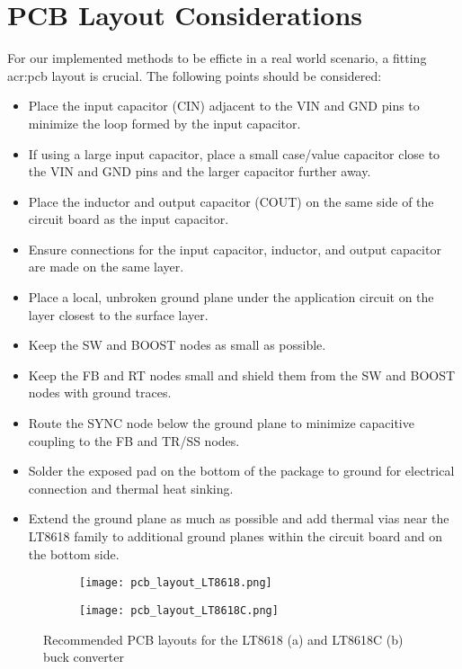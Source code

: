 \section{PCB Layout Considerations}
\label{section:pcb_layout_considerations}
For our implemented methods to be efficte in a real world scenario, a fitting \Gls{acr:pcb} layout is crucial. The following points should be considered\autocite{LT8618DatasheetProduct}:
\begin{itemize}
    \item Place the input capacitor (CIN) adjacent to the VIN and GND pins to minimize the loop formed by the input capacitor.
    \item If using a large input capacitor, place a small case/value capacitor close to the VIN and GND pins and the larger capacitor further away.
    \item Place the inductor and output capacitor (COUT) on the same side of the circuit board as the input capacitor.
    \item Ensure connections for the input capacitor, inductor, and output capacitor are made on the same layer.
    \item Place a local, unbroken ground plane under the application circuit on the layer closest to the surface layer.
    \item Keep the SW and BOOST nodes as small as possible.
    \item Keep the FB and RT nodes small and shield them from the SW and BOOST nodes with ground traces.
    \item Route the SYNC node below the ground plane to minimize capacitive coupling to the FB and TR/SS nodes.
    \item Solder the exposed pad on the bottom of the package to ground for electrical connection and thermal heat sinking.
    \item Extend the ground plane as much as possible and add thermal vias near the LT8618 family to additional ground planes within the circuit board and on the bottom side.
\end{itemize}



\begin{figure}[htbp]
    \centering
    \begin{subfigure}[b]{0.45\textwidth}
        \centering
        \texttt{[image: pcb\_layout\_LT8618.png]}
        \label{fig:pcb_layout_LT8618}
    \end{subfigure}
    \hfill
    \begin{subfigure}[b]{0.45\textwidth}
        \centering
        \texttt{[image: pcb\_layout\_LT8618C.png]}
        \label{fig:pcb_layout_LT8618C}
    \end{subfigure}
    \caption{Recommended PCB layouts for the LT8618 (a) and LT8618C (b) buck converter \autocite{LT8618DatasheetProduct}}
\end{figure}

